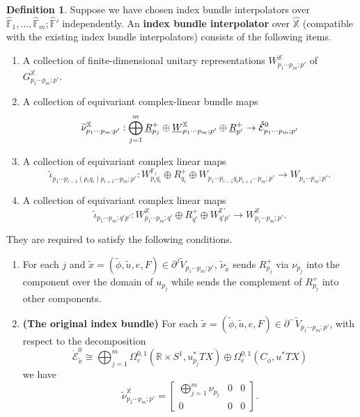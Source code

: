\documentclass[reqno, 10pt]{amsart}
\numberwithin{equation}{section}
\numberwithin{equation}{section}
\theoremstyle{definition}
\newtheorem{defn}[thm]{Definition}
\theoremstyle{remark}
\newcommand{\beqn}{\begin{equation*}}
\newcommand{\eeqn}{\end{equation*}}
\newcommand{\mb}{\mathbb}
\newcommand{\mc}{\mathcal}
\newcommand{\wt}{\widetilde}
\newcommand{\uds}[1]{\underline{\smash{#1}}}
\begin{document}
\begin{defn}\label{defn_bundle_interpolator_module}
Suppose we have chosen index bundle interpolators over $\hat {\mb F}_1, \ldots, \hat {\mb F}_m; \hat {\mb F}'$ independently. An {\bf index bundle interpolator} over $\hat {\mb X}$ (compatible with the existing index bundle interpolators) consists of the following items. 
\begin{enumerate}

\item A collection of finite-dimensional unitary representations $W_{p_1 \cdots p_m; p'}^{\mb X}$ of $G_{p_1 \cdots p_m; p'}^{\mb X}$.

\item A collection of equivariant complex-linear bundle maps
\beqn
\wt \nu_{p_1 \cdots p_m; p'}^{\mb X}: \bigoplus_{j=1}^m \uds R_{p_j}^+ \oplus \uds W_{p_1 \cdots p_m; p'}^{\mb X} \oplus \uds R_{p'}^+ \to \mathring {\mc E}_{p_1 \cdots p_m; p'}^0
\eeqn

\item A collection of equivariant complex linear maps
\beqn
\wt\iota_{p_1 \cdots p_{i-1} (p_i q_i) p_{i+1} \cdots p_m; p'}: W_{p_i q_i}^{\mb{F}_i} \oplus R_{q_i}^+ \oplus W_{p_1 \cdots p_{i-1} q_i p_{i+1} \cdots p_m; p'} \to W_{p_1 \cdots p_m; p'}.
\eeqn

\item A collection of equivariant complex linear maps
\beqn
\wt \iota_{p_1 \cdots p_m; q'p'}: W_{p_1 \cdots p_m; q'}^{\mb X} \oplus R_{q'}^+ \oplus W_{q'p'}^{{\mb F}'} \to W_{p_1 \cdots p_m; p'}^{\mb X}.
\eeqn
\end{enumerate}
They are required to satisfy the following conditions.
\begin{enumerate}

     \item For each $j$ and $\wt x = (\wt \phi, \wt u, e, F) \in \partial^j \wt V_{p_1 \cdots p_m; p'}$, $\wt\nu_{\wt x}$ sends $R_{p_j}^+$ via $\nu_{p_j}$ into the component over the domain of $u_{p_j}$ while sends the complement of $R_{p_j}^+$ into other components.

    \item {\bf (The original index bundle)} For each $\wt x = (\wt \phi, \wt u, e, F) \in \partial^- \wt V_{p_1 \cdots p_m; p'}$, with respect to the decomposition
    \beqn
    \mathring {\mc E}_{\wt x}^0 \cong \bigoplus_{j=1}^m \Omega_c^{0,1}({\mb R}\times S^1, u_{p_j}^* TX) \oplus \Omega_c^{0,1}( C_\phi, u^* TX)
    \eeqn
    we have
    \beqn
    \wt\nu_{p_1 \cdots p_m; p'}^{\mb X} = \left[  \begin{array}{ccc} \bigoplus_{j=1}^m \nu_{p_j} & 0 & 0 \\
    0 & 0 & 0 \end{array}\right].
    \eeqn
    

\end{enumerate}
\end{defn}
\end{document}

